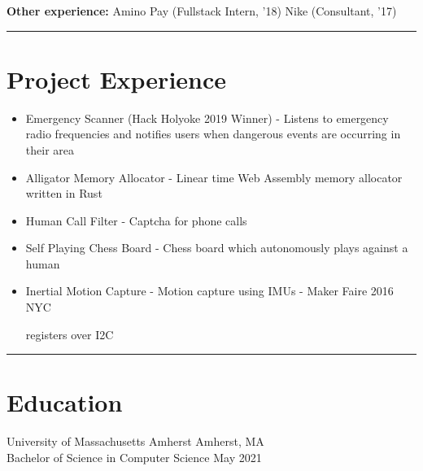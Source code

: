 \documentclass[10pt]{article}
\begin{document}
\begin{flushleft}


    \textbf{Other experience:} Amino Pay (Fullstack Intern, '18) Nike (Consultant, '17)

	\rule{\columnwidth}{0.4pt}

\section{Project Experience}
    \begin{itemize}
        \item Emergency Scanner (Hack Holyoke 2019 Winner) - Listens to emergency radio frequencies and notifies users when dangerous events are occurring in their area

        \item Alligator Memory Allocator - Linear time Web Assembly memory allocator written in Rust
    
		\item Human Call Filter - Captcha for phone calls

		\item Self Playing Chess Board - Chess board which autonomously plays against a human

		\item Inertial Motion Capture - Motion capture using IMUs - Maker Faire 2016 NYC


			registers over I2C


	\end{itemize}

	\rule{\columnwidth}{0.4pt}

\section{Education}
	University of Massachusetts Amherst \hfill Amherst, MA \\
	Bachelor of Science in Computer Science \hfill May 2021 \\


\end{flushleft}
\end{document}
